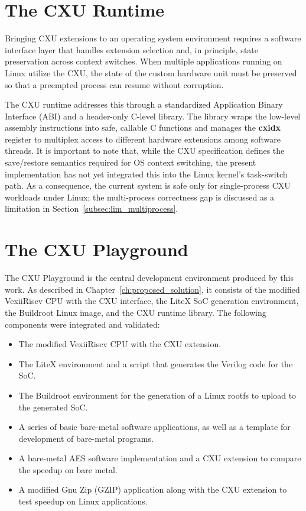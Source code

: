 \section{The CXU Runtime}
\label{sec:cxu_runtime}

Bringing CXU extensions to an operating system environment requires a software
interface layer that handles extension selection and, in principle, state preservation
across context switches.
When multiple applications running on Linux utilize the CXU, the state of the custom
hardware unit must be preserved so that a preempted process can resume without
corruption.

The CXU runtime addresses this through a standardized Application Binary Interface
(ABI) and a header-only C-level library.
The library wraps the low-level assembly instructions into safe, callable C functions
and manages the \textbf{cxidx} register to multiplex access to different hardware
extensions among software threads.
It is important to note that, while the CXU specification defines the save/restore
semantics required for OS context switching, the present implementation has not yet
integrated this into the Linux kernel's task-switch path.
As a consequence, the current system is safe only for single-process CXU workloads
under Linux; the multi-process correctness gap is discussed as a limitation in
Section~\ref{subsec:lim_multiprocess}.

\section{The CXU Playground}
\label{sec:cxu_playground_impl}

The CXU Playground is the central development environment produced by this work.
As described in Chapter~\ref{ch:proposed_solution}, it consists of the modified
VexiiRiscv CPU with the CXU interface, the LiteX SoC generation environment, the
Buildroot Linux image, and the CXU runtime library.
The following components were integrated and validated:

\begin{itemize}
    \item The modified VexiiRiscv CPU with the CXU extension.
    \item The LiteX environment and a script that generates the Verilog code for the SoC.
    \item The Buildroot environment for the generation of a Linux rootfs to upload to the generated SoC.
    \item A series of basic bare-metal software applications, as well as a template for development of bare-metal programs.
    \item A bare-metal AES software implementation and a CXU extension to compare the speedup on bare metal.
    \item A modified Gnu Zip (GZIP) application along with the CXU extension to test speedup on Linux applications.
\end{itemize}

